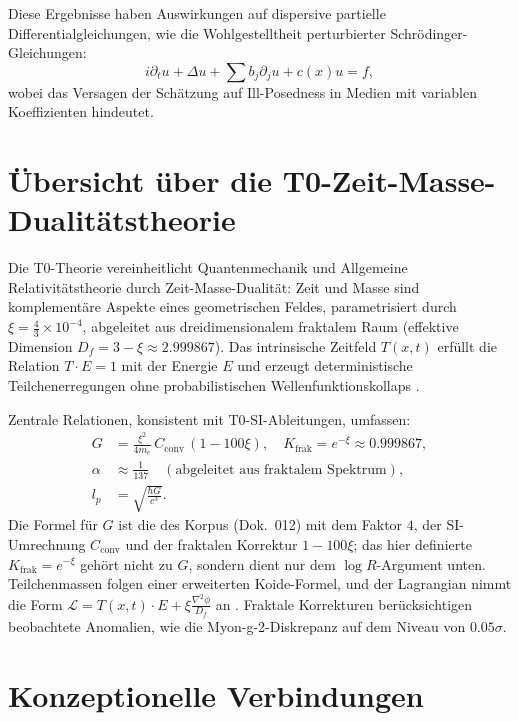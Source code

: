 	Diese Ergebnisse haben Auswirkungen auf dispersive partielle Differentialgleichungen, wie die Wohlgestelltheit perturbierter Schrödinger-Gleichungen:
	\begin{equation}
		i \partial_t u + \Delta u + \sum b_j \partial_j u + c(x) u = f,
	\end{equation}
	wobei das Versagen der Schätzung auf Ill-Posedness in Medien mit variablen Koeffizienten hindeutet.
	
	\section{Übersicht über die T0-Zeit-Masse-Dualitätstheorie}
	
	Die T0-Theorie vereinheitlicht Quantenmechanik und Allgemeine Relativitätstheorie durch Zeit-Masse-Dualität: Zeit und Masse sind komplementäre Aspekte eines geometrischen Feldes, parametrisiert durch $\xi = \frac{4}{3} \times 10^{-4}$, abgeleitet aus dreidimensionalem fraktalem Raum (effektive Dimension $D_f = 3 - \xi \approx 2.999867$). Das intrinsische Zeitfeld $T(x,t)$ erfüllt die Relation $T \cdot E = 1$ mit der Energie $E$ und erzeugt deterministische Teilchenerregungen ohne probabilistischen Wellenfunktionskollaps \cite{T0_tm_erweiterung}.
	
	Zentrale Relationen, konsistent mit T0-SI-Ableitungen, umfassen:
	\begin{align}
		G &= \frac{\xi^2}{4m_e}\, C_\text{conv}\,(1 - 100\xi), \quad K_\text{frak} = e^{-\xi} \approx 0.999867, \label{eq:G} \\
		\alpha &\approx \frac{1}{137} \quad (\text{abgeleitet aus fraktalem Spektrum}), \label{eq:alpha} \\
		l_p &= \sqrt{\frac{\hbar G}{c^3}}. \label{eq:lp}
	\end{align}
	Die Formel für $G$ ist die des Korpus (Dok.~012) mit dem Faktor $4$, der SI-Umrechnung $C_\text{conv}$ und der fraktalen Korrektur $1-100\xi$; das hier definierte $K_\text{frak} = e^{-\xi}$ gehört nicht zu $G$, sondern dient nur dem $\log R$-Argument unten.
	Teilchenmassen folgen einer erweiterten Koide-Formel, und der Lagrangian nimmt die Form $\mathcal{L} = T(x,t) \cdot E + \xi \frac{\nabla^2 \phi}{D_f}$ an \cite{T0_g2_erweiterung}. Fraktale Korrekturen berücksichtigen beobachtete Anomalien, wie die Myon-g-2-Diskrepanz auf dem Niveau von $0.05\sigma$.
	
	\section{Konzeptionelle Verbindungen}
	
